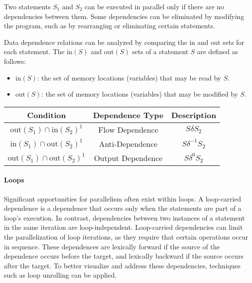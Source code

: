 Two statements $S_1$ and $S_2$ can be executed in parallel only if there are no dependencies between them. 
Some dependencies can be eliminated by modifying the program, such as by rearranging or eliminating certain statements.

Data dependence relations can be analyzed by comparing the $\text{in}$ and $\text{out}$ sets for each statement. 
The $\text{in}(S)$ and $\text{out}(S)$ sets of a statement $S$ are defined as follows:
\begin{itemize}
    \item $\text{in}(S)$: the set of memory locations (variables) that may be read by $S$.
    \item $\text{out}(S)$: the set of memory locations (variables) that may be modified by $S$.
\end{itemize}

\renewcommand*{\arraystretch}{2}
\begin{table}[H]
    \centering
    \begin{tabular}{|c|c|c|}
    \hline
    \textbf{Condition} & \textbf{Dependence Type} & \textbf{Description} \\
    \hline
    $\text{out}(S_1) \cap \text{in}(S_2)^1$ & Flow Dependence & $S\delta S_2$ \\
    \hline
    $\text{in}(S_1) \cap \text{out}(S_2)^1$ & Anti-Dependence & $S\delta^{-1} S_2$ \\
    \hline
    $\text{out}(S_1) \cap \text{out}(S_2)^1$ & Output Dependence & $S\delta^0 S_2$ \\
    \hline
    \end{tabular}
\end{table}
\renewcommand*{\arraystretch}{1}

\paragraph*{Loops}
Significant opportunities for parallelism often exist within loops. A loop-carried dependence is a dependence that occurs only when the statements are part of a loop's execution. 
In contrast, dependencies between two instances of a statement in the same iteration are loop-independent.
Loop-carried dependencies can limit the parallelization of loop iterations, as they require that certain operations occur in sequence.
These dependences are lexically forward if the source of the dependence occurs before the target, and lexically backward if the source occurs after the target. 
To better visualize and address these dependencies, techniques such as loop unrolling can be applied.

